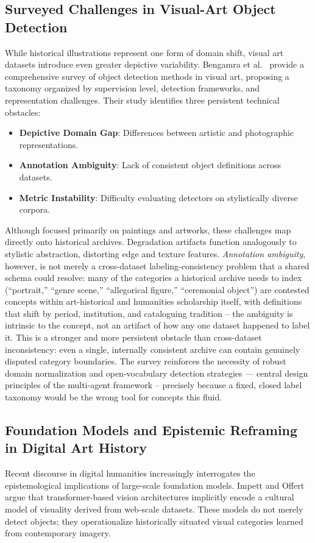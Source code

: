 \documentclass[12pt,a4paper]{report}
\begin{document}
\subsection{Surveyed Challenges in Visual-Art Object Detection}
\label{sec:annotation_ambiguity_note}
While historical illustrations represent one form of domain shift, visual art datasets introduce even greater depictive variability. Bengamra et al.~\cite{bengamra2024survey_visualart_od} provide a comprehensive survey of object detection methods in visual art, proposing a taxonomy organized by supervision level, detection frameworks, and representation challenges. Their study identifies three persistent technical obstacles:

\begin{itemize}
    \item \textbf{Depictive Domain Gap}: Differences between artistic and photographic representations.
    \item \textbf{Annotation Ambiguity}: Lack of consistent object definitions across datasets.
    \item \textbf{Metric Instability}: Difficulty evaluating detectors on stylistically diverse corpora.
\end{itemize}

Although focused primarily on paintings and artworks, these challenges map directly onto historical archives. Degradation artifacts function analogously to stylistic abstraction, distorting edge and texture features. \textit{Annotation ambiguity}, however, is not merely a cross-dataset labeling-consistency problem that a shared schema could resolve: many of the categories a historical archive needs to index (``portrait,'' ``genre scene,'' ``allegorical figure,'' ``ceremonial object'') are contested concepts within art-historical and humanities scholarship itself, with definitions that shift by period, institution, and cataloguing tradition -- the ambiguity is intrinsic to the concept, not an artifact of how any one dataset happened to label it. This is a stronger and more persistent obstacle than cross-dataset inconsistency: even a single, internally consistent archive can contain genuinely disputed category boundaries. The survey reinforces the necessity of robust domain normalization and open-vocabulary detection strategies --- central design principles of the multi-agent framework -- precisely because a fixed, closed label taxonomy would be the wrong tool for concepts this fluid.

\subsection{Foundation Models and Epistemic Reframing in Digital Art History}
Recent discourse in digital humanities increasingly interrogates the epistemological implications of large-scale foundation models. Impett and Offert~\cite{impett_offert_2022_dah} argue that transformer-based vision architectures implicitly encode a cultural model of visuality derived from web-scale datasets. These models do not merely detect objects; they operationalize historically situated visual categories learned from contemporary imagery.
\end{document}
